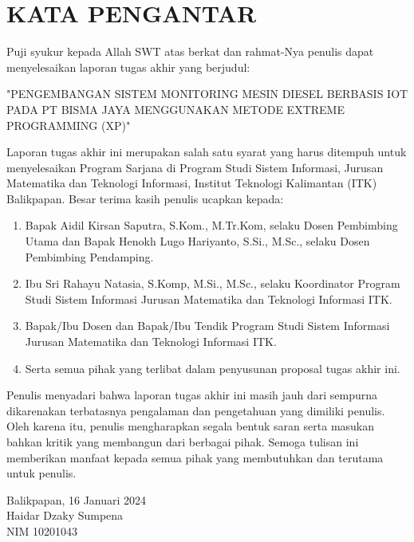 \chapter*{KATA PENGANTAR}

Puji syukur kepada Allah SWT atas berkat dan rahmat-Nya penulis dapat menyelesaikan laporan tugas akhir yang berjudul:

\begin{center}
    "PENGEMBANGAN SISTEM MONITORING MESIN DIESEL BERBASIS IOT PADA PT BISMA JAYA MENGGUNAKAN METODE EXTREME PROGRAMMING (XP)"
\end{center}

Laporan tugas akhir ini merupakan salah satu syarat yang harus
ditempuh untuk menyelesaikan Program Sarjana di Program Studi Sistem
Informasi, Jurusan Matematika dan Teknologi Informasi, Institut Teknologi
Kalimantan (ITK) Balikpapan. Besar terima kasih penulis ucapkan kepada:

\begin{enumerate}[topsep=0pt,itemsep=0pt,partopsep=0pt, parsep=0pt]

    \item Bapak Aidil Kirsan Saputra, S.Kom., M.Tr.Kom, selaku Dosen Pembimbing Utama dan
    Bapak Henokh Lugo Hariyanto, S.Si., M.Sc., selaku Dosen Pembimbing
    Pendamping.

    \item Ibu Sri Rahayu Natasia, S.Komp, M.Si., M.Sc., selaku Koordinator Program
    Studi Sistem Informasi Jurusan Matematika dan Teknologi Informasi ITK.

    \item Bapak/Ibu Dosen dan Bapak/Ibu Tendik Program Studi Sistem Informasi
    Jurusan Matematika dan Teknologi Informasi ITK.

    \item Serta semua pihak yang terlibat dalam penyusunan proposal tugas akhir ini.
\end{enumerate}

Penulis menyadari bahwa laporan tugas akhir ini masih jauh dari sempurna dikarenakan terbatasnya pengalaman dan pengetahuan yang dimiliki penulis. Oleh karena itu, penulis mengharapkan segala bentuk saran serta masukan bahkan kritik yang membangun dari berbagai pihak. Semoga tulisan ini memberikan manfaat kepada semua pihak yang membutuhkan dan terutama untuk penulis.

\vspace{0.5cm}
\begin{flushright}
    Balikpapan, 16 Januari 2024\\
    \vspace{2cm}
    {Haidar Dzaky Sumpena}\\
    NIM {10201043}
\end{flushright}

